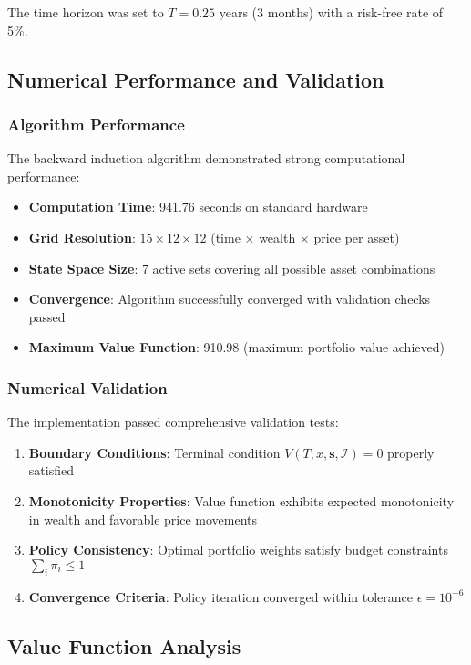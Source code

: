 \documentclass[11pt]{article}
\begin{document}
The time horizon was set to $T = 0.25$ years (3 months) with a risk-free rate of 5\%.

\subsection{Numerical Performance and Validation}

\subsubsection{Algorithm Performance}
The backward induction algorithm demonstrated strong computational performance:

\begin{itemize}
\item \textbf{Computation Time}: 941.76 seconds on standard hardware
\item \textbf{Grid Resolution}: $15 \times 12 \times 12$ (time $\times$ wealth $\times$ price per asset)
\item \textbf{State Space Size}: 7 active sets covering all possible asset combinations
\item \textbf{Convergence}: Algorithm successfully converged with validation checks passed
\item \textbf{Maximum Value Function}: 910.98 (maximum portfolio value achieved)
\end{itemize}

\subsubsection{Numerical Validation}
The implementation passed comprehensive validation tests:

\begin{enumerate}
\item \textbf{Boundary Conditions}: Terminal condition $V(T,x,\mathbf{s},\mathcal{I}) = 0$ properly satisfied
\item \textbf{Monotonicity Properties}: Value function exhibits expected monotonicity in wealth and favorable price movements
\item \textbf{Policy Consistency}: Optimal portfolio weights satisfy budget constraints $\sum_i \pi_i \leq 1$
\item \textbf{Convergence Criteria}: Policy iteration converged within tolerance $\epsilon = 10^{-6}$
\end{enumerate}

\subsection{Value Function Analysis}
\end{document}
